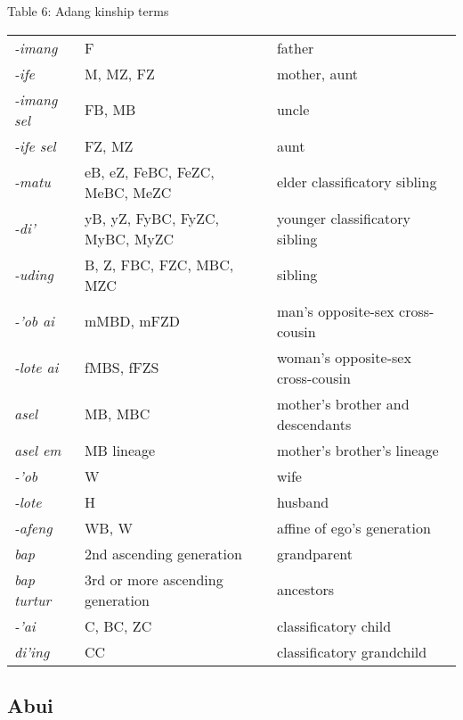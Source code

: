 {\centering
Table 6: Adang kinship terms
\par}

\begin{center}
\tablehead{}
\begin{supertabular}{m{0.7698598in}m{2.55316in}m{2.44276in}}
\textit{{}-imang} &
F &
father\\
\textit{{}-ife} &
M, MZ, FZ &
mother, aunt\\
\textit{{}-imang sel} &
FB, MB &
uncle\\
\textit{{}-ife sel} &
FZ, MZ &
aunt\\
\textit{{}-matu} &
eB, eZ, FeBC, FeZC, MeBC, MeZC  &
elder classificatory sibling\\
\textit{{}-di{\textquoteright}} &
yB, yZ, FyBC, FyZC, MyBC, MyZC &
younger classificatory sibling\\
\textit{{}-uding} &
B, Z, FBC, FZC, MBC, MZC &
sibling\\
\textit{{}-{\textquoteright}ob ai} &
mMBD, mFZD &
man{\textquoteright}s opposite-sex cross-cousin\\
\textit{{}-lote ai} &
fMBS, fFZS &
woman{\textquoteright}s opposite-sex cross-cousin\\
\textit{asel} &
MB, MBC &
mother{\textquoteright}s brother and descendants\\
\textit{asel em} &
MB lineage &
mother{\textquoteright}s brother{\textquoteright}s lineage\\
\textit{{}-{\textquoteright}ob} &
W &
wife\\
\textit{{}-lote} &
H &
husband\\
\textit{{}-afeng} &
WB, W &
affine of ego{\textquoteright}s generation\\
\textit{bap} &
2nd ascending generation &
grandparent\\
\textit{bap turtur} &
3rd or more ascending generation &
ancestors\\
\textit{{}-{\textquoteright}ai} &
C, BC, ZC &
classificatory child\\
\textit{di{\textquoteright}ing} &
CC &
classificatory grandchild\\
\end{supertabular}
\end{center}
\clearpage\subsection[Abui]{Abui}
